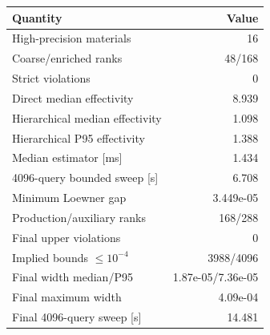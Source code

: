 \begin{tabular}{lr}
\toprule
Quantity & Value \\
\midrule
High-precision materials & 16 \\ 
Coarse/enriched ranks & 48/168 \\ 
Strict violations & 0 \\ 
Direct median effectivity & 8.939 \\ 
Hierarchical median effectivity & 1.098 \\ 
Hierarchical P95 effectivity & 1.388 \\ 
Median estimator [ms] & 1.434 \\ 
4096-query bounded sweep [s] & 6.708 \\ 
Minimum Loewner gap & 3.449e-05 \\ 
\midrule
Production/auxiliary ranks & 168/288 \\ 
Final upper violations & 0 \\ 
Implied bounds $\leq 10^{-4}$ & 3988/4096 \\ 
Final width median/P95 & 1.87e-05/7.36e-05 \\ 
Final maximum width & 4.09e-04 \\ 
Final 4096-query sweep [s] & 14.481 \\ 
\bottomrule
\end{tabular}
